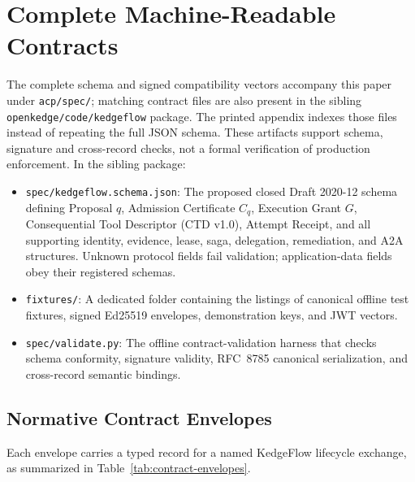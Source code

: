 \section{Complete Machine-Readable Contracts}
\label{sec:app-schema}

The complete schema and signed compatibility vectors accompany this paper under \texttt{acp/spec/}; matching contract files are also present in the sibling \texttt{openkedge/code/kedgeflow} package. The printed appendix indexes those files instead of repeating the full JSON schema. These artifacts support schema, signature and cross-record checks, not a formal verification of production enforcement. In the sibling package:
\begin{itemize}
\item \texttt{spec/kedgeflow.schema.json}: The proposed closed Draft 2020-12 schema defining Proposal $q$, Admission Certificate $C_q$, Execution Grant $G$, Consequential Tool Descriptor (CTD v1.0), Attempt Receipt, and all supporting identity, evidence, lease, saga, delegation, remediation, and A2A structures. Unknown protocol fields fail validation; application-data fields obey their registered schemas.
\item \texttt{fixtures/}: A dedicated folder containing the listings of canonical offline test fixtures, signed Ed25519 envelopes, demonstration keys, and JWT vectors.
\item \texttt{spec/validate.py}: The offline contract-validation harness that checks schema conformity, signature validity, RFC~8785 canonical serialization, and cross-record semantic bindings.
\end{itemize}

\subsection{Normative Contract Envelopes}
Each envelope carries a typed record for a named KedgeFlow lifecycle exchange, as summarized in Table~\ref{tab:contract-envelopes}.

